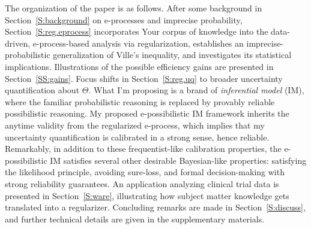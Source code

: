 \documentclass[a4paper, 12pt]{article}
\theoremstyle{plain}
\theoremstyle{definition}
\theoremstyle{remark}
\begin{document}
The organization of the paper is as follows.  After some background in Section~\ref{S:background} on e-processes and imprecise probability, Section~\ref{S:reg.eprocess} incorporates Your corpus of knowledge into the data-driven, e-process-based analysis via regularization,   
establishes an imprecise-probabilistic generalization of Ville's inequality, and investigates its statistical implications.  Illustrations of the possible efficiency gains are presented in Section~\ref{SS:gains}.  Focus shifts in Section~\ref{S:reg.uq} to broader uncertainty quantification about $\Theta$.  What I'm proposing is a brand of {\em inferential model} (IM), where the familiar probabilistic reasoning is replaced by provably reliable possibilistic reasoning. My proposed e-possibilistic IM framework inherits the anytime validity from the regularized e-process, which implies that my uncertainty quantification is calibrated in a strong sense, hence reliable.  Remarkably, in addition to these frequentist-like calibration properties, the e-possibilistic IM satisfies several other desirable Bayesian-like properties: satisfying the likelihood principle, avoiding sure-loss, and formal decision-making with strong reliability guarantees.  An application analyzing clinical trial data is presented in Section~\ref{S:ware}, illustrating how subject matter knowledge gets translated into a regularizer.  Concluding remarks are made in Section~\ref{S:discuss}, and further technical details are given in the supplementary materials. 







\end{document}
